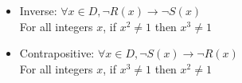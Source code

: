\begin{enumerate}
\begin{itemize}
\begin{itemize}
                        \item Inverse:
                                $\forall x \in D, \neg R(x) \to \neg S(x)$      \\
                                For all integers $x$, if $x^{2} \neq 1$ then $x^{3} \neq 1$     
                        
                        \item Contrapositive:
                                $\forall x \in D, \neg S(x) \to \neg R(x)$      \\
                                For all integers $x$, if $x^{3} \neq 1$ then $x^{2} \neq 1$     
                    \end{itemize}
        \end{itemize}
        
\end{enumerate}


